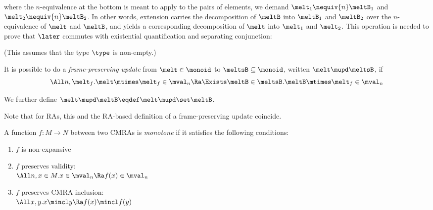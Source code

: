 \begin{center}
\end{center}
where the $n$-equivalence at the bottom is meant to apply to the pairs of elements, \ie we demand $\melt_1 \nequiv{n} \meltB_1$ and $\melt_2 \nequiv{n} \meltB_2$.
In other words, extension carries the decomposition of $\meltB$ into $\meltB_1$ and $\meltB_2$ over the $n$-equivalence of $\melt$ and $\meltB$, and yields a corresponding decomposition of $\melt$ into $\melt_1$ and $\melt_2$.
This operation is needed to prove that $\later$ commutes with existential quantification and separating conjunction:
(This assumes that the type $\type$ is non-empty.)

\begin{defn}
  It is possible to do a \emph{frame-preserving update} from $\melt \in \monoid$ to $\meltsB \subseteq \monoid$, written $\melt \mupd \meltsB$, if
  \[ \All n, \melt_f. \melt \mtimes \melt_f \in \mval_n \Ra \Exists \meltB \in \meltsB. \meltB \mtimes \melt_f \in \mval_n \]

  We further define $\melt \mupd \meltB \eqdef \melt \mupd \set\meltB$.
\end{defn}
Note that for RAs, this and the RA-based definition of a frame-preserving update coincide.


\begin{defn}
  A function $f : M \to N$ between two CMRAs is \emph{monotone} if it satisfies the following conditions:
  \begin{enumerate}
  \item $f$ is non-expansive
  \item $f$ preserves validity: \\
    $\All n, x \in M. x \in \mval_n \Ra f(x) \in \mval_n$
  \item $f$ preserves CMRA inclusion:\\
    $\All x, y. x \mincl y \Ra f(x) \mincl f(y)$
  \end{enumerate}
\end{defn}

